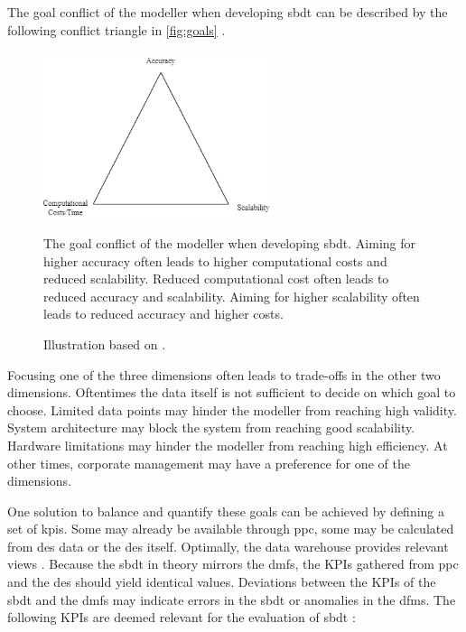 The goal conflict of the modeller when developing \gls{sbdt} can be described by the following conflict triangle in \autoref{fig:goals} \autocite{robinson2014simulation,balci2012life}.

\begin{figure}[htbp]
  \centering
  \includegraphics[width=0.6\textwidth]{figures/goals.png}
  \caption[Conflict Triangle]{The goal conflict of the modeller when developing \gls{sbdt}. Aiming for higher accuracy often leads to higher computational costs and reduced scalability. Reduced computational cost often leads to reduced accuracy and scalability. Aiming for higher scalability often leads to reduced accuracy and  higher costs.}
  \label{fig:goals}
  \caption*{Illustration based on \autocite{robinson2014simulation,balci2012life}.}
\end{figure}

Focusing one of the three dimensions often leads to trade-offs in the other two dimensions. Oftentimes the data itself is not sufficient to decide on which goal to choose. Limited data points may hinder the modeller from reaching high validity. System architecture may block the system from reaching good scalability. Hardware limitations may hinder the modeller from reaching high efficiency.
At other times, corporate management may have a preference for one of the dimensions.

One solution to balance and quantify these goals can be achieved by defining a set of \gls{kpi}s. Some may already be available through \gls{ppc}, some may be calculated from \gls{des} data or the \gls{des} itself. Optimally, the data warehouse provides relevant views \autocite{cui2020manufacturing}. Because the \gls{sbdt} in theory mirrors the \gls{dmfs}, the KPIs gathered from \gls{ppc} and the \gls{des} should yield identical values. Deviations between the KPIs of the \gls{sbdt} and the \gls{dmfs} may indicate errors in the \gls{sbdt} or anomalies in the \gls{dfms}. The following KPIs are deemed relevant for the evaluation of \gls{sbdt} \autocite{friederich2023framework}:

